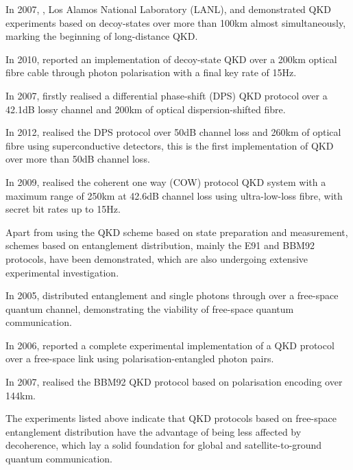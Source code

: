 \documentclass[aps, rmp, twocolumn, amsmath, amssymb, nofootinbib, superscriptaddress, longbibliography, floatfix, table-of-contents, eqsecnum]{revtex4-1}
\newcommand{\comment}[1]{{\color{blue}{\textbf{#1}}}}
\begin{document}
In 2007, \cite{bib:PRL_98_010505}, Los Alamos National Laboratory (LANL), \cite{bib:PRL_09_010503x} and \cite{bib:PRL_98_010504} demonstrated QKD experiments based on decoy-states over more than 100km almost simultaneously, marking the beginning of long-distance QKD.

In 2010, \cite{bib:OptExp_18_8587} reported an implementation of decoy-state QKD over a 200km optical fibre cable through photon polarisation with a final key rate of 15Hz.

In 2007, \cite{bib:NP_1_343} firstly realised a differential phase-shift (DPS) QKD protocol over a 42.1dB lossy channel and 200km of optical dispersion-shifted fibre.

In 2012, \cite{bib:OL_37_1008} realised the DPS protocol over 50dB channel loss and 260km of optical fibre using superconductive detectors, this is the first implementation of QKD over more than 50dB channel loss.

In 2009, \cite{bib:NJP_11_075003} realised the coherent one way (COW) protocol QKD system with a maximum range of 250km at 42.6dB channel loss using ultra-low-loss fibre, with secret bit rates up to 15Hz.
 
Apart from using the QKD scheme based on state preparation and measurement, schemes based on entanglement distribution, mainly the E91 \cite{bib:PRL_67_661} and BBM92 \cite{bib:PRL_68_557} protocols, have been demonstrated, which are also undergoing extensive experimental investigation.

In 2005, \cite{bib:OE_13_202} distributed entanglement and single photons through over a free-space quantum channel, demonstrating the viability of free-space quantum communication. 

In 2006, \cite{bib:APL_89_101122} reported a complete experimental implementation of a QKD protocol over a free-space link using polarisation-entangled photon pairs.

In 2007, \cite{bib:NP_3_481} realised the BBM92 QKD protocol based on polarisation encoding over 144km.

The experiments listed above indicate that QKD protocols based on free-space entanglement distribution have the advantage of being less affected by decoherence, which lay a solid foundation for global and satellite-to-ground quantum communication.

\comment{Up to here}
\end{document}

